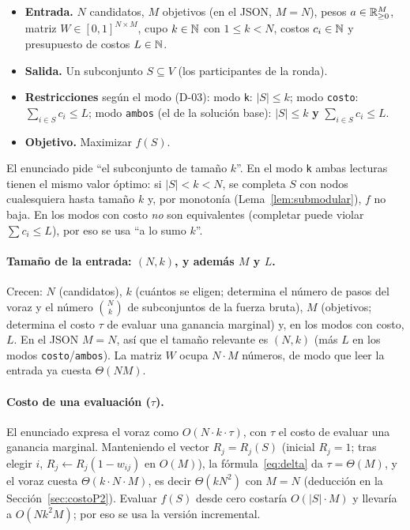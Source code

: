\begin{definicion}\label{def:seleccion}
\leavevmode
\begin{itemize}[leftmargin=*]
\item \textbf{Entrada.} $N$ candidatos, $M$ objetivos (en el JSON, $M=N$), pesos $a\in\mathbb{R}_{\ge0}^{M}$, matriz $W\in[0,1]^{N\times M}$, cupo $k\in\mathbb{N}$ con $1\le k<N$, costos $c_i\in\mathbb{N}$ y presupuesto de costos $L\in\mathbb{N}$.
\item \textbf{Salida.} Un subconjunto $S\subseteq V$ (los participantes de la ronda).
\item \textbf{Restricciones} según el modo (D-03): modo \texttt{k}: $|S|\le k$; modo \texttt{costo}: $\sum_{i\in S}c_i\le L$; modo \texttt{ambos} (el de la solución base): $|S|\le k$ \textbf{y} $\sum_{i\in S}c_i\le L$.
\item \textbf{Objetivo.} Maximizar $f(S)$.
\end{itemize}
\end{definicion}

\begin{observacion}\label{obs:exactok}
El enunciado pide ``el subconjunto de tamaño $k$''. En el modo \texttt{k} ambas lecturas tienen el mismo valor óptimo: si $|S|<k<N$, se completa $S$ con nodos cualesquiera hasta tamaño $k$ y, por monotonía (Lema~\ref{lem:submodular}), $f$ no baja. En los modos con costo \emph{no} son equivalentes (completar puede violar $\sum c_i\le L$), por eso se usa ``a lo sumo $k$''.
\end{observacion}

\paragraph{Tamaño de la entrada: $(N,k)$, y además $M$ y $L$.} Crecen: $N$ (candidatos), $k$ (cuántos se eligen; determina el número de pasos del voraz y el número $\binom{N}{k}$ de subconjuntos de la fuerza bruta), $M$ (objetivos; determina el costo $\tau$ de evaluar una ganancia marginal) y, en los modos con costo, $L$. En el JSON $M=N$, así que el tamaño relevante es $(N,k)$ (más $L$ en los modos \texttt{costo}/\texttt{ambos}). La matriz $W$ ocupa $N\cdot M$ números, de modo que leer la entrada ya cuesta $\Theta(NM)$.

\paragraph{Costo de una evaluación ($\tau$).} El enunciado expresa el voraz como $O(N\cdot k\cdot\tau)$, con $\tau$ el costo de evaluar una ganancia marginal. Manteniendo el vector $R_j=R_j(S)$ (inicial $R_j=1$; tras elegir $i$, $R_j\leftarrow R_j(1-w_{ij})$ en $O(M)$), la fórmula~\eqref{eq:delta} da $\tau=\Theta(M)$, y el voraz cuesta $\Theta(k\cdot N\cdot M)$, es decir $\Theta(kN^2)$ con $M=N$ (deducción en la Sección~\ref{sec:costoP2}). Evaluar $f(S)$ desde cero costaría $O(|S|\cdot M)$ y llevaría a $O(N k^2 M)$; por eso se usa la versión incremental.

